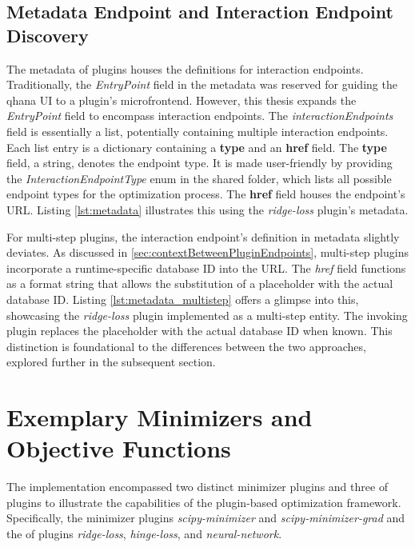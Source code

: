 \documentclass[
  a4paper,  %
  twoside,  %
  bibliography=totoc,
  headsepline,
  cleardoublepage=empty,
  parskip=half,
  draft=false
]{scrbook}
\begin{document}
\subsection{Metadata Endpoint and Interaction Endpoint Discovery}
\label{sec:metadataEndpoint}
The metadata of plugins houses the definitions for interaction endpoints.
Traditionally, the \emph{EntryPoint} field in the metadata was reserved for guiding the \gls{qhana} UI to a plugin's microfrontend.
However, this thesis expands the \emph{EntryPoint} field to encompass interaction endpoints.
The \emph{interactionEndpoints} field is essentially a list, potentially containing multiple interaction endpoints.
Each list entry is a dictionary containing a \textbf{type} and an \textbf{href} field.
The \textbf{type} field, a string, denotes the endpoint type.
It is made user-friendly by providing the \emph{InteractionEndpointType} enum in the shared folder, which lists all possible endpoint types for the optimization process.
The \textbf{href} field houses the endpoint's URL.
Listing \ref{lst:metadata} illustrates this using the \emph{ridge-loss} plugin's metadata.



For multi-step plugins, the interaction endpoint's definition in metadata slightly deviates.
As discussed in \ref{sec:contextBetweenPluginEndpoints}, multi-step plugins incorporate a runtime-specific database ID into the URL.
The \emph{href} field functions as a format string that allows the substitution of a placeholder with the actual database ID.
Listing \ref{lst:metadata_multistep} offers a glimpse into this, showcasing the \emph{ridge-loss} plugin implemented as a multi-step entity.
The invoking plugin replaces the placeholder with the actual database ID when known.
This distinction is foundational to the differences between the two approaches, explored further in the subsequent section.



\section{Exemplary Minimizers and Objective Functions}
\label{sec:exampleMinimizersAndObjectiveFunctions}

The implementation encompassed two distinct minimizer plugins and three \gls{of} plugins to illustrate the capabilities of the plugin-based optimization framework.
Specifically, the minimizer plugins \emph{scipy-minimizer} and \emph{scipy-minimizer-grad} and the \gls{of} plugins \emph{ridge-loss}, \emph{hinge-loss}, and \emph{neural-network}.
\end{document}
